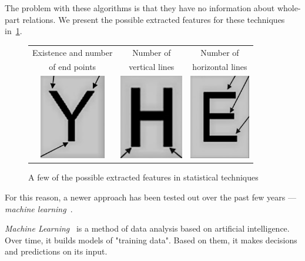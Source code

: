 The problem with these algorithms is that they have no information about whole-part relations. We present the possible extracted features for these techniques in~\cref{fig:characterClassificationStatis}.

\begin{figure}[t]
\centering
{\sffamily
\begin{tabular}{ccc}
Existence and number & Number of & Number of \\
of end points & vertical lines & horizontal lines \\
\includegraphics[height=10em]{img/characterClassification/statis_endPoint.jpg}
&
\includegraphics[height=10em]{img/characterClassification/statis_vertical.jpg}
&
\includegraphics[height=10em]{img/characterClassification/statis_horizontal.jpg} \\
\end{tabular}
}
\caption{A few of the possible extracted features in statistical techniques~\citep{vithlani2015structural}}
\label{fig:characterClassificationStatis}
\end{figure}

For this reason, a newer approach has been tested out over the past few years --- \emph{machine learning}~\citep{characterClassification}.

\emph{Machine Learning}~\citep{sebastiani2002machine} is a method of data analysis based on artificial intelligence. Over time, it builds models of "training data". Based on them, it makes decisions and predictions on its input. 

